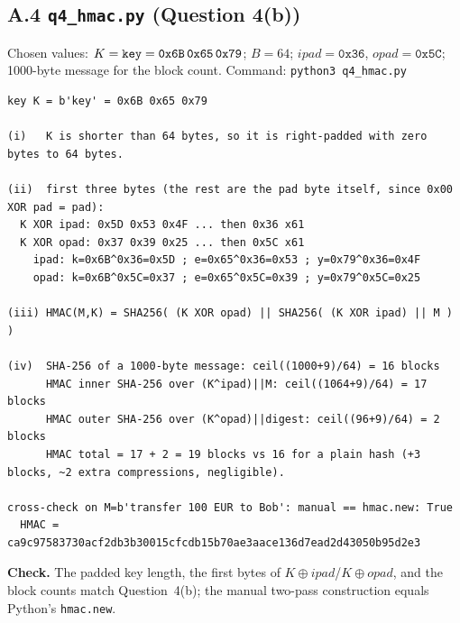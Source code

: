 \documentclass[11pt,a4paper]{article}
\begin{document}
\subsection*{A.4 \texttt{q4\_hmac.py} (Question 4(b))}
Chosen values: $K=\texttt{key}=\texttt{0x6B\,0x65\,0x79}$; $B=64$; $ipad=\texttt{0x36}$,
$opad=\texttt{0x5C}$; 1000-byte message for the block count. Command: \texttt{python3 q4\_hmac.py}
\begin{Verbatim}[fontsize=\footnotesize, frame=single]
key K = b'key' = 0x6B 0x65 0x79

(i)   K is shorter than 64 bytes, so it is right-padded with zero bytes to 64 bytes.

(ii)  first three bytes (the rest are the pad byte itself, since 0x00 XOR pad = pad):
  K XOR ipad: 0x5D 0x53 0x4F ... then 0x36 x61
  K XOR opad: 0x37 0x39 0x25 ... then 0x5C x61
    ipad: k=0x6B^0x36=0x5D ; e=0x65^0x36=0x53 ; y=0x79^0x36=0x4F
    opad: k=0x6B^0x5C=0x37 ; e=0x65^0x5C=0x39 ; y=0x79^0x5C=0x25

(iii) HMAC(M,K) = SHA256( (K XOR opad) || SHA256( (K XOR ipad) || M ) )

(iv)  SHA-256 of a 1000-byte message: ceil((1000+9)/64) = 16 blocks
      HMAC inner SHA-256 over (K^ipad)||M: ceil((1064+9)/64) = 17 blocks
      HMAC outer SHA-256 over (K^opad)||digest: ceil((96+9)/64) = 2 blocks
      HMAC total = 17 + 2 = 19 blocks vs 16 for a plain hash (+3 blocks, ~2 extra compressions, negligible).

cross-check on M=b'transfer 100 EUR to Bob': manual == hmac.new: True
  HMAC = ca9c97583730acf2db3b30015cfcdb15b70ae3aace136d7ead2d43050b95d2e3
\end{Verbatim}
\textbf{Check.} The padded key length, the first bytes of $K\oplus ipad$/$K\oplus opad$, and the block
counts match Question~4(b); the manual two-pass construction equals Python's \texttt{hmac.new}.
\end{document}
